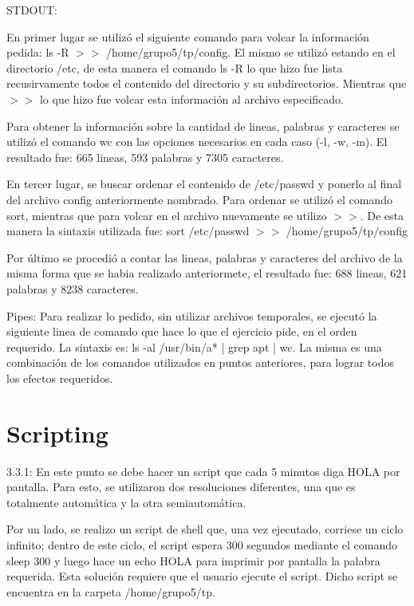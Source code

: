 \documentclass[a4paper, 12pt]{article}
\begin{document}
STDOUT:

En primer lugar se utiliz\'o el siguiente comando para volcar la informaci\'on pedida: ls -R $>>$ /home/grupo5/tp/config. El mismo se utiliz\'o estando en el directorio /etc, de esta manera el comando ls -R lo que hizo fue lista recusirvamente todos el contenido del directorio y su subdirectorios. Mientras que $>>$ lo que hizo fue volcar esta informaci\'on al archivo especificado.

Para obtener la informaci\'on sobre la cantidad de lineas, palabras y caracteres se utiliz\'o el comando wc con las opciones necesarios en cada caso (-l, -w, -m). El resultado fue: 665 lineas, 593 palabras y 7305 caracteres.

En tercer lugar, se buscar ordenar el contenido de /etc/passwd y ponerlo al final del archivo config anteriormente nombrado. Para ordenar se utiliz\'o el comando sort, mientras que para volcar en el archivo nuevamente se utilizo $>>$. De esta manera la sintaxis utilizada fue: sort /etc/passwd $>>$ /home/grupo5/tp/config

Por \'ultimo se procedi\'o a contar las lineas, palabras y caracteres del archivo de la misma forma que se habia realizado anteriormete, el resultado fue: 688 lineas, 621 palabras y 8238 caracteres.

\medskip


Pipes: Para realizar lo pedido, sin utilizar archivos temporales, se ejecut\'o la siguiente linea de comando que hace lo que el ejercicio pide, en el orden requerido. La sintaxis es: ls -al /usr/bin/a* | grep apt | wc. La misma es una combinaci\'on de los comandos utilizados en puntos anteriores, para lograr todos los efectos requeridos.



\section*{Scripting}

3.3.1: En este punto se debe hacer un script que cada 5 minutos diga HOLA por pantalla. Para esto, se utilizaron dos resoluciones diferentes, una que es totalmente autom\'atica y la otra semiautom\'atica. 

Por un lado, se realizo un script de shell que, una vez ejecutado, corriese un ciclo infinito; dentro de este ciclo, el script espera 300 segundos mediante el comando sleep 300 y luego hace un echo HOLA para imprimir por pantalla la palabra requerida. Esta soluci\'on requiere que el usuario ejecute el script. Dicho script se encuentra en la carpeta /home/grupo5/tp.
\end{document}
